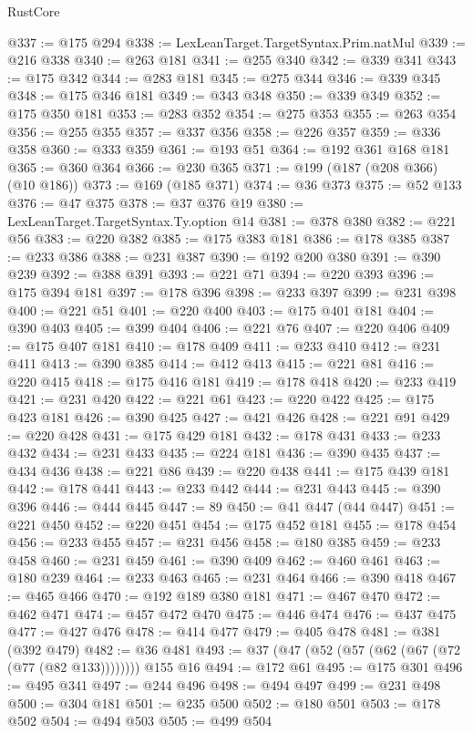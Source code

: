 \begin{lexlean}{RustCore}
\begin{coremodule}
@337 := @175 @294
@338 := LexLeanTarget.TargetSyntax.Prim.natMul
@339 := @216 @338
@340 := @263 @181
@341 := @255 @340
@342 := @339 @341
@343 := @175 @342
@344 := @283 @181
@345 := @275 @344
@346 := @339 @345
@348 := @175 @346 @181
@349 := @343 @348
@350 := @339 @349
@352 := @175 @350 @181
@353 := @283 @352
@354 := @275 @353
@355 := @263 @354
@356 := @255 @355
@357 := @337 @356
@358 := @226 @357
@359 := @336 @358
@360 := @333 @359
@361 := @193 @51
@364 := @192 @361 @168 @181
@365 := @360 @364
@366 := @230 @365
@371 := @199 (@187 (@208 @366) (@10 @186))
@373 := @169 (@185 @371)
@374 := @36 @373
@375 := @52 @133
@376 := @47 @375
@378 := @37 @376 @19
@380 := LexLeanTarget.TargetSyntax.Ty.option @14
@381 := @378 @380
@382 := @221 @56
@383 := @220 @382
@385 := @175 @383 @181
@386 := @178 @385
@387 := @233 @386
@388 := @231 @387
@390 := @192 @200 @380
@391 := @390 @239
@392 := @388 @391
@393 := @221 @71
@394 := @220 @393
@396 := @175 @394 @181
@397 := @178 @396
@398 := @233 @397
@399 := @231 @398
@400 := @221 @51
@401 := @220 @400
@403 := @175 @401 @181
@404 := @390 @403
@405 := @399 @404
@406 := @221 @76
@407 := @220 @406
@409 := @175 @407 @181
@410 := @178 @409
@411 := @233 @410
@412 := @231 @411
@413 := @390 @385
@414 := @412 @413
@415 := @221 @81
@416 := @220 @415
@418 := @175 @416 @181
@419 := @178 @418
@420 := @233 @419
@421 := @231 @420
@422 := @221 @61
@423 := @220 @422
@425 := @175 @423 @181
@426 := @390 @425
@427 := @421 @426
@428 := @221 @91
@429 := @220 @428
@431 := @175 @429 @181
@432 := @178 @431
@433 := @233 @432
@434 := @231 @433
@435 := @224 @181
@436 := @390 @435
@437 := @434 @436
@438 := @221 @86
@439 := @220 @438
@441 := @175 @439 @181
@442 := @178 @441
@443 := @233 @442
@444 := @231 @443
@445 := @390 @396
@446 := @444 @445
@447 := 89
@450 := @41 @447 (@44 @447)
@451 := @221 @450
@452 := @220 @451
@454 := @175 @452 @181
@455 := @178 @454
@456 := @233 @455
@457 := @231 @456
@458 := @180 @385
@459 := @233 @458
@460 := @231 @459
@461 := @390 @409
@462 := @460 @461
@463 := @180 @239
@464 := @233 @463
@465 := @231 @464
@466 := @390 @418
@467 := @465 @466
@470 := @192 @189 @380 @181
@471 := @467 @470
@472 := @462 @471
@474 := @457 @472 @470
@475 := @446 @474
@476 := @437 @475
@477 := @427 @476
@478 := @414 @477
@479 := @405 @478
@481 := @381 (@392 @479)
@482 := @36 @481
@493 := @37 (@47 (@52 (@57 (@62 (@67 (@72 (@77 (@82 @133)))))))) @155 @16
@494 := @172 @61
@495 := @175 @301
@496 := @495 @341
@497 := @244 @496
@498 := @494 @497
@499 := @231 @498
@500 := @304 @181
@501 := @235 @500
@502 := @180 @501
@503 := @178 @502
@504 := @494 @503
@505 := @499 @504

\end{coremodule}
\end{lexlean}
